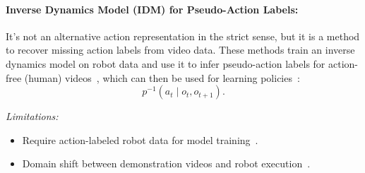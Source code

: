 \paragraph{Inverse Dynamics Model (IDM) for Pseudo-Action Labels:}
It's not an alternative action representation in the strict sense, but it is a method to recover missing action labels from video data.
These methods train an inverse dynamics model on robot data and use it to infer pseudo-action labels for action-free (human) videos~\cite{Baker2022VideoP, Torabi2018BehavioralCF, Schmeckpeper2020ReinforcementLW}, which can then be used for learning policies~\cite{McCarthy_2025}:
\begin{equation}
p^{-1}(a_t \mid o_t, o_{t+1}).
\end{equation}

\textit{Limitations:}
\begin{itemize}
    \item Require action-labeled robot data for model training~\cite{Baker2022VideoP, Torabi2018BehavioralCF, Schmeckpeper2020ReinforcementLW}.
    \item Domain shift between demonstration videos and robot execution~\cite{Baker2022VideoP, Schmeckpeper2020ReinforcementLW, Kim2023GivingRA}.
\end{itemize}






